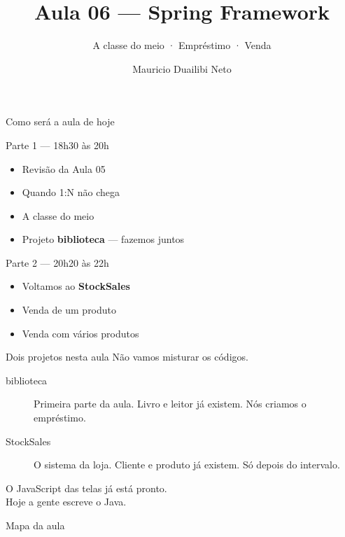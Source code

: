 \documentclass[aspectratio=169,11pt]{beamer}
\title{Aula 06 --- Spring Framework}
\subtitle{A classe do meio · Empréstimo · Venda}
\author{Mauricio Duailibi Neto}
\institute{Turma Java Entra21}
\date{}
\begin{document}
\begin{frame}
  \titlepage
\end{frame}

\begin{frame}{Como será a aula de hoje}
  \begin{block}{Parte 1 --- 18h30 às 20h}
    \begin{itemize}
      \item Revisão da Aula 05
      \item Quando 1{:}N não chega
      \item A classe do meio
      \item Projeto \textbf{biblioteca} --- fazemos juntos
    \end{itemize}
  \end{block}

  \vspace{0.4em}
  \begin{block}{Parte 2 --- 20h20 às 22h}
    \begin{itemize}
      \item Voltamos ao \textbf{StockSales}
      \item Venda de um produto
      \item Venda com vários produtos
    \end{itemize}
  \end{block}
\end{frame}

\begin{frame}{Dois projetos nesta aula}
  Não vamos misturar os códigos.

  \vspace{0.6em}
  \begin{description}
    \item[biblioteca] Primeira parte da aula.
      Livro e leitor já existem. Nós criamos o empréstimo.
    \item[StockSales] O sistema da loja.
      Cliente e produto já existem. Só depois do intervalo.
  \end{description}

  \vspace{0.6em}
  O JavaScript das telas já está pronto.\\
  Hoje a gente escreve o Java.
\end{frame}

\begin{frame}{Mapa da aula}
  \tableofcontents
\end{frame}

\end{document}
